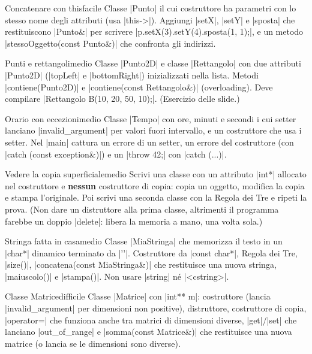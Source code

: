 \begin{esercizio}{Concatenare con this}{facile}
Classe \cc|Punto| il cui costruttore ha parametri con lo stesso nome degli attributi
(usa \cc|this->|). Aggiungi \cc|setX|, \cc|setY| e \cc|sposta| che restituiscono
\cc|Punto&| per scrivere \cc|p.setX(3).setY(4).sposta(1, 1);|, e un metodo
\cc|stessoOggetto(const Punto&)| che confronta gli indirizzi.
\end{esercizio}

\begin{esercizio}{Punti e rettangoli}{medio}
Classe \cc|Punto2D| e classe \cc|Rettangolo| con due attributi \cc|Punto2D|
(\cc|topLeft| e \cc|bottomRight|) inizializzati nella lista. Metodi
\cc|contiene(Punto2D)| e \cc|contiene(const Rettangolo&)| (overloading). Deve
compilare \cc|Rettangolo B({10, 20}, {50, 10});|. (Esercizio delle slide.)
\end{esercizio}

\begin{esercizio}{Orario con eccezioni}{medio}
Classe \cc|Tempo| con ore, minuti e secondi i cui setter lanciano
\cc|invalid_argument| per valori fuori intervallo, e un costruttore che usa i setter.
Nel \cc|main| cattura un errore di un setter, un errore del costruttore (con
\cc|catch (const exception&)|) e un \cc|throw 42;| con \cc|catch (...)|.
\end{esercizio}

\begin{esercizio}{Vedere la copia superficiale}{medio}
Scrivi una classe con un attributo \cc|int*| allocato nel costruttore e
\textbf{nessun} costruttore di copia: copia un oggetto, modifica la copia e stampa
l'originale. Poi scrivi una seconda classe con la Regola dei Tre e ripeti la prova.
(Non dare un distruttore alla prima classe, altrimenti il programma farebbe un
doppio \cc|delete|: libera la memoria a mano, una volta sola.)
\end{esercizio}

\begin{esercizio}{Stringa fatta in casa}{medio}
Classe \cc|MiaStringa| che memorizza il testo in un \cc|char*| dinamico terminato da
\cc|'\0'|. Costruttore da \cc|const char*|, Regola dei Tre, \cc|size()|,
\cc|concatena(const MiaStringa&)| che restituisce una nuova stringa,
\cc|maiuscolo()| e \cc|stampa()|. Non usare \cc|string| né \cc|<cstring>|.
\end{esercizio}

\begin{esercizio}{Classe Matrice}{difficile}
Classe \cc|Matrice| con \cc|int** m|: costruttore (lancia \cc|invalid_argument| per
dimensioni non positive), distruttore, costruttore di copia, \cc|operator=| che
funziona anche tra matrici di dimensioni diverse, \cc|get|/\cc|set| che lanciano
\cc|out_of_range| e \cc|somma(const Matrice&)| che restituisce una nuova matrice
(o lancia se le dimensioni sono diverse).
\end{esercizio}

